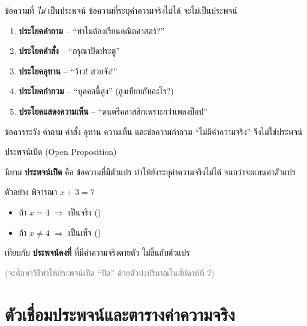 \begin{frame}{ข้อความที่ \emph{ไม่} เป็นประพจน์}
  ข้อความที่ระบุค่าความจริงไม่ได้ จะไม่เป็นประพจน์
  \begin{enumerate}
    \item \textbf{ประโยคคำถาม} -- ``ทำไมต้องเรียนคณิตศาสตร์?''
    \item \textbf{ประโยคคำสั่ง} -- ``กรุณาปิดประตู''
    \item \textbf{ประโยคอุทาน} -- ``ว้าว! สวยจัง!''
    \item \textbf{ประโยคกำกวม} -- ``บุคคลนี้สูง'' (สูงเทียบกับอะไร?)
    \item \textbf{ประโยคแสดงความเห็น} -- ``ดนตรีคลาสสิกเพราะกว่าเพลงป็อป''
  \end{enumerate}
  \vspace{0.4em}
  \begin{alertblock}{ข้อควรระวัง}
    คำถาม คำสั่ง อุทาน ความเห็น และข้อความกำกวม ``ไม่มีค่าความจริง'' จึงไม่ใช่ประพจน์
  \end{alertblock}
\end{frame}

\begin{frame}{ประพจน์เปิด (Open Proposition)}
  \begin{block}{นิยาม}
    \textbf{ประพจน์เปิด} คือ ข้อความที่มีตัวแปร ทำให้ยังระบุค่าความจริงไม่ได้
    จนกว่าจะแทนค่าตัวแปร
  \end{block}
  \vspace{0.6em}
  ตัวอย่าง พิจารณา $x + 3 = 7$
  \begin{itemize}
    \item ถ้า $x = 4$ \hfill $\Rightarrow$ เป็นจริง (\TT)
    \item ถ้า $x \neq 4$ \hfill $\Rightarrow$ เป็นเท็จ (\FF)
  \end{itemize}
  \vspace{0.6em}
  เทียบกับ \textbf{ประพจน์คงที่} ที่มีค่าความจริงตายตัว ไม่ขึ้นกับตัวแปร
  \par\medskip
  \textcolor{gray}{(จะศึกษาวิธีทำให้ประพจน์เปิด ``ปิด'' ด้วยตัวบ่งปริมาณในสัปดาห์ที่ 2)}
\end{frame}


\section{ตัวเชื่อมประพจน์และตารางค่าความจริง}

